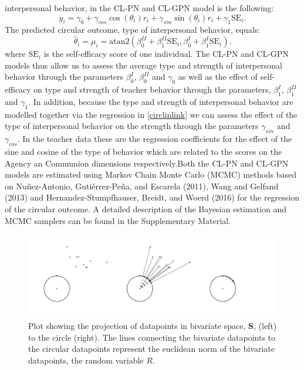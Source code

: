 \documentclass[man]{apa6}
\theoremstyle{definition}
\theoremstyle{definition}
\theoremstyle{definition}
\theoremstyle{remark}
\begin{document}
interpersonal behavior, in the CL-PN and CL-GPN model is the following:
\[\hat{y}_i = \gamma_0 + \gamma_{cos}\cos(\theta_i)r_i +
\gamma_{sin}\sin(\theta_i)r_i + \gamma_1\text{SE}_i.\] The predicted
circular outcome, type of interpersonal behavior, equals:
\[\hat{\theta}_i = \mu_i =
\mbox{atan2} (\beta_0^{II} + \beta_1^{II}\text{SE}_i, \beta_0^{I} +
\beta_1^{I}\text{SE}_i).\] \noindent where \(\text{SE}_i\) is the
self-efficacy score of one individual. The CL-PN and CL-GPN models thus
allow us to assess the average type and strength of interpersonal
behavior through the parameters \(\beta_{0}^{I}\), \(\beta_{0}^{II}\)
and \(\gamma_0\) as well as the effect of self-efficacy on type and
strength of teacher behavior through the parameters, \(\beta_{1}^{I}\),
\(\beta_{1}^{II}\) and \(\gamma_1\). In addition, because the type and
strength of interpersonal behavior are modelled together via the
regression in \eqref{circlinlink} we can assess the effect of the type
of interpersonal behavior on the strength through the parameters
\(\gamma_{sin}\) and \(\gamma_{cos}\). In the teacher data these are the
regression coefficients for the effect of the sine and cosine of the
type of behavior which are related to the scores on the Agency an
Communion dimensions respectively.\newline \indent Both the CL-PN and
CL-GPN models are estimated using Markov Chain Monte Carlo (MCMC)
methods based on Nuñez-Antonio, Gutiérrez-Peña, and Escarela (2011),
Wang and Gelfand (2013) and Hernandez-Stumpfhauser, Breidt, and Woerd
(2016) for the regression of the circular outcome. A detailed
description of the Bayesian estimation and MCMC samplers can be found in
the Supplementary Material.

\begin{figure}
\centering
\includegraphics[width = \textwidth]{Plots/plotprojecting.pdf}
\caption{Plot showing the projection of datapoints in bivariate space, $\boldsymbol{S}$, (left) to the circle (right). The lines connecting the bivariate datapoints to the circular datapoints represent the euclidean norm of the bivariate datapoints, the random variable $R$.}
\label{projection}
\end{figure}
\end{document}

